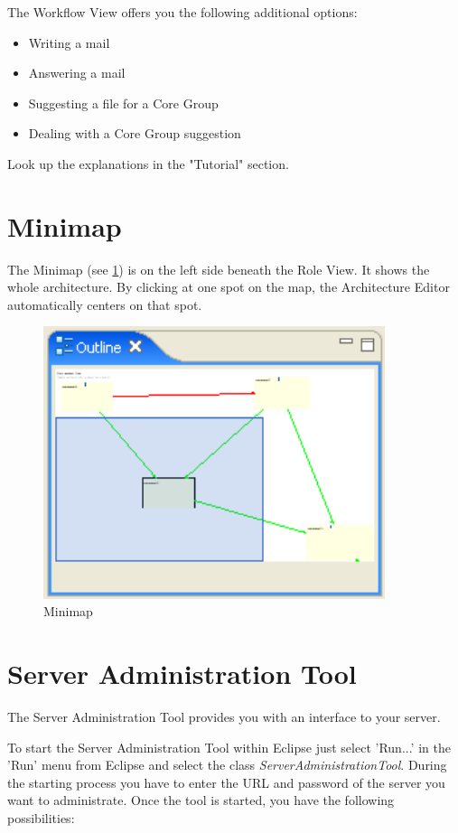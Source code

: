 The Workflow View offers you the following additional options:
\begin{itemize}
	\item Writing a mail
	\item Answering a mail
	\item Suggesting a file for a Core Group
	\item Dealing with a Core Group suggestion
\end{itemize}
Look up the explanations in the "Tutorial" section.

\section{Minimap}

The Minimap (see \ref{map}) is on the left side beneath the Role View. It shows the whole architecture.
By clicking at one spot on the map, the Architecture Editor automatically centers on that
spot. 

\begin{figure}[h!]
\begin{center}
\includegraphics[width=10cm]{outline.png}
   \caption{Minimap}
\label{map}
\end{center}
\end{figure}\par


\section{Server Administration Tool}

The Server Administration Tool provides you with an interface to your server. \par
To start the Server Administration Tool within Eclipse just select 'Run...' in the
'Run' menu from Eclipse and select the class
{\it ServerAdministrationTool}.
During the starting process you have to enter the URL and password of the server 
you want to administrate. Once the tool is started, you have the following 
possibilities:

